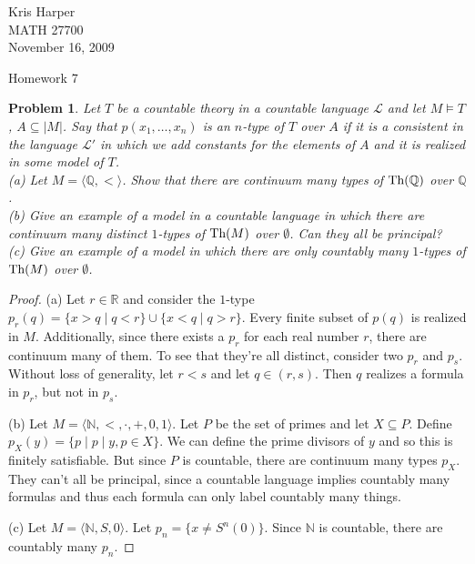 \documentclass{article}
\newtheorem{problem}{Problem}
\renewcommand{\th}{\textup{Th}}
\begin{document}
\begin{flushright}
Kris Harper\\

MATH 27700\\

November 16, 2009
\end{flushright}

\begin{center}
Homework 7
\end{center}

\begin{problem}
Let $T$ be a countable theory in a countable language $\mathcal{L}$ and let $M \models T$, $A \subseteq |M|$. Say that $p(x_1, \dots , x_n)$ is an \emph{$n$-type of $T$ over $A$} if it is a consistent in the language $\mathcal{L}'$ in which we add constants for the elements of $A$ and it is realized in some model of $T$.\\
(a) Let $M = \langle \mathbb{Q}, < \rangle$. Show that there are continuum many types of $\th(\mathbb{Q})$ over $\mathbb{Q}$.\\
(b) Give an example of a model in a countable language in which there are continuum many distinct $1$-types of $\th(M)$ over $\emptyset$. Can they all be principal?\\
(c) Give an example of a model in which there are only countably many $1$-types of $\th(M)$ over $\emptyset$.
\end{problem}
\begin{proof}
(a) Let $r \in \mathbb{R}$ and consider the $1$-type $p_r(q) = \{x > q \mid q < r\} \cup \{x < q \mid q > r\}$. Every finite subset of $p(q)$ is realized in $M$. Additionally, since there exists a $p_r$ for each real number $r$, there are continuum many of them. To see that they're all distinct, consider two $p_r$ and $p_s$. Without loss of generality, let $r < s$ and let $q \in (r, s)$. Then $q$ realizes a formula in $p_r$, but not in $p_s$.

(b) Let $M = \langle \mathbb{N}, <, \cdot, +, 0, 1 \rangle$. Let $P$ be the set of primes and let $X \subseteq P$. Define $p_X(y) = \{p \mid p \mid y, p \in X\}$. We can define the prime divisors of $y$ and so this is finitely satisfiable. But since $P$ is countable, there are continuum many types $p_X$. They can't all be principal, since a countable language implies countably many formulas and thus each formula can only label countably many things.

(c) Let $M = \langle \mathbb{N}, S, 0 \rangle$. Let $p_n = \{x \neq S^n(0)\}$. Since $\mathbb{N}$ is countable, there are countably many $p_n$.
\end{proof}
\end{document}
